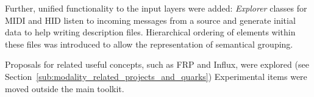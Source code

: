 \documentclass{article}
\begin{document}
\begin{description}
	Further, unified functionality to the input layers were added: \emph{Explorer} classes for MIDI and HID listen to incoming messages from a source and generate initial data to help writing description files.
	Hierarchical ordering of elements within these files was introduced to allow the representation of semantical grouping.

	Proposals for related useful concepts, such as FRP and Influx, were explored (see Section~\ref{sub:modality_related_projects_and_quarks})
	Experimental items were moved outside the main toolkit.

	
		
		

\end{description}
\end{document}
